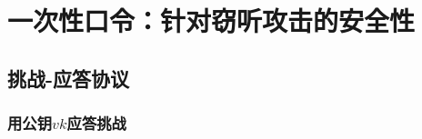 \section{一次性口令：针对窃听攻击的安全性}

\subsection{挑战-应答协议}\label{subsec:18-6-1}

\subsubsection{用公钥$vk$应答挑战}\label{subsubsec:18-6-1-1}